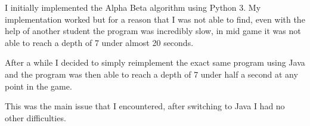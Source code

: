 I initially implemented the Alpha Beta algorithm using Python 3.
My implementation worked but for a reason that I was not able to find, even with the help of another student the program was incredibly slow, in mid game it was not able to reach a depth of 7 under almost 20 seconds.

After a while I decided to simply reimplement the exact same program using Java and the program was then able to reach a depth of 7 under half a second at any point in the game.

This was the main issue that I encountered, after switching to Java I had no other difficulties.
